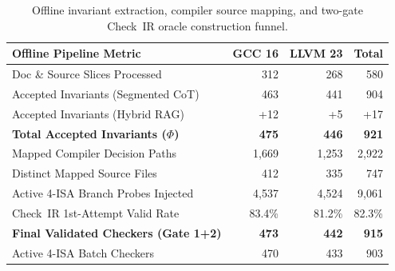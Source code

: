 \begin{table}[t]
\centering
\caption{Offline invariant extraction, compiler source mapping, and two-gate Check~IR oracle construction funnel.}
\label{tab:invariant-funnel}
\small
\setlength{\tabcolsep}{4.5pt}
\begin{tabular}{@{}lrrr@{}}
\toprule
\textbf{Offline Pipeline Metric} & \textbf{GCC 16} & \textbf{LLVM 23} & \textbf{Total} \\
\midrule
Doc \& Source Slices Processed & 312 & 268 & 580 \\
Accepted Invariants (Segmented CoT) & 463 & 441 & 904 \\
Accepted Invariants (Hybrid RAG) & +12 & +5 & +17 \\
\textbf{Total Accepted Invariants ($\Phi$)} & \textbf{475} & \textbf{446} & \textbf{921} \\
\midrule
Mapped Compiler Decision Paths & 1,669 & 1,253 & 2,922 \\
Distinct Mapped Source Files & 412 & 335 & 747 \\
Active 4-ISA Branch Probes Injected & 4,537 & 4,524 & 9,061 \\
\midrule
Check~IR 1st-Attempt Valid Rate & 83.4\% & 81.2\% & 82.3\% \\
\textbf{Final Validated Checkers (Gate 1+2)} & \textbf{473} & \textbf{442} & \textbf{915} \\
Active 4-ISA Batch Checkers & 470 & 433 & 903 \\
\bottomrule
\end{tabular}
\end{table}
